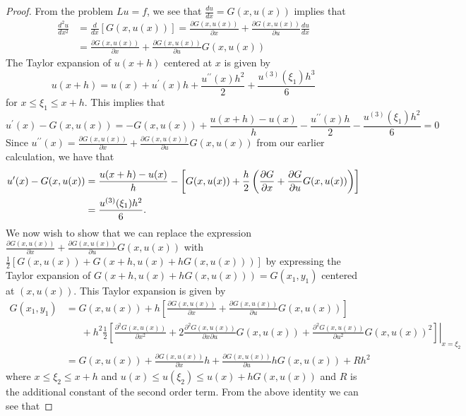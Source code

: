 \documentclass[12pt]{article}
\theoremstyle{definition}
\begin{document}
\begin{proof}
  From the problem $Lu = f$, we see that $\frac{du}{dx} = G(x, u(x))$ implies that
  \begin{align*}
    \frac{d^2 u}{dx^2} &= \frac{d}{dx}\left[G(x, u(x))\right] = \frac{\partial G(x, u(x))}{\partial x} + \frac{\partial G(x, u(x))}{\partial u} \frac{du}{dx} \\
    &= \frac{\partial G(x, u(x))}{\partial x} + \frac{\partial G(x, u(x))}{\partial u} G(x, u(x))
  \end{align*}
  The Taylor expansion of $u(x+h)$ centered at $x$ is given by
  \[
    u(x + h) = u(x) + u^{\prime}(x) h + \frac{u^{\prime \prime}(x) h^2}{2} + \frac{u^{(3)}(\xi_1) h^3}{6}
  \]
  for $x \leq \xi_1 \leq x+h$. This implies that
  \[
    u^{\prime}(x) - G(x, u(x)) = -G(x, u(x)) + \frac{u(x+h) - u(x)}{h} - \frac{u^{\prime \prime}(x) h}{2} - \frac{u^{(3)}(\xi_1) h^2}{6} = 0
  \]
  Since $u^{\prime \prime}(x) = \frac{\partial G(x, u(x))}{\partial x} + \frac{\partial G(x, u(x))}{\partial u} G(x, u(x))$ from our earlier calculation, we have that
  \begin{align}\label{first_taylor}
    u^{\prime}(x) - G(x, u(x)) &= \frac{u(x+h) - u(x)}{h} - \left[G(x, u(x)) + \frac{h}{2}\left(\frac{\partial G}{\partial x} + \frac{\partial G}{\partial u} G(x, u(x))\right)\right] \\
    &= \frac{u^{(3)}(\xi_1) h^2}{6}.\notag
  \end{align}
  We now wish to show that we can replace the expression $\frac{\partial G(x, u(x))}{\partial x} + \frac{\partial G(x, u(x))}{\partial u} G(x, u(x))$ with
  $\frac{1}{2}[G(x, u(x)) + G(x + h, u(x) + h G(x, u(x)))]$ by expressing the Taylor expansion of $G(x + h, u(x) + h G(x, u(x))) = G(x_1, y_1)$
  centered at $(x, u(x))$. This Taylor expansion is given by
  \begin{align*}
    G(x_1, y_1) &= G(x, u(x)) + h\left[\frac{\partial G(x, u(x))}{\partial x} + \frac{\partial G(x, u(x))}{\partial u} G(x, u(x))\right]\\
    &\phantom{=}\ + \left. h^2\frac{1}{2}\left[\frac{\partial^2 G(x, u(x))}{\partial x^2} + 2 \frac{\partial^2 G(x, u(x))}{\partial x \partial u}G(x, u(x)) + \frac{\partial ^2G(x, u(x))}{\partial u^2}G(x, u(x))^2\right] \right|_{x=\xi_2}\\
    &= G(x, u(x)) + \frac{\partial G(x, u(x))}{\partial x} h + \frac{\partial G(x, u(x))}{\partial u} h G(x, u(x)) + R h^2
  \end{align*}
  where $x \leq \xi_2 \leq x + h$ and $u(x) \leq u(\xi_2) \leq u(x) + hG(x, u(x))$
  and $R$ is the additional constant of the second order term. From the above identity we can see that

\end{proof}
\end{document}
